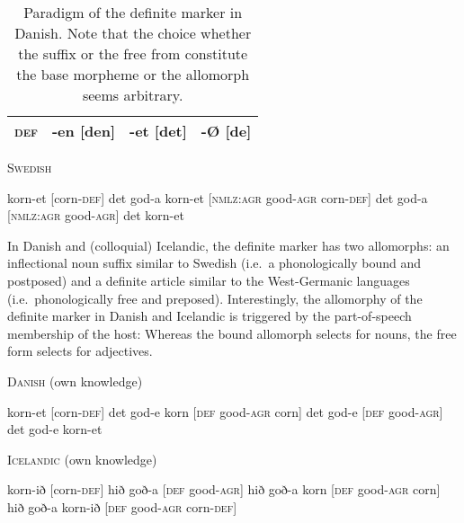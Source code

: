{\begin{table}[h]
\begin{center}
\begin{footnotesize}
\begin{tabular}{l | ccc}
\hline
\textsc{def}&-en [den]			&-et [det]			&-{Ø} [de]\\
\hline
\hline
\end{tabular}
\caption[Paradigm of \textsc{def} in {\sc Danish}]{Paradigm of the definite marker in {\sc Danish}. Note that the choice whether the suffix or the free from constitute the base morpheme or the allomorph seems arbitrary.}\label{danish defallomorph}
\end{footnotesize}
\end{center}
\end{table}
\newpage
\begin{exe}
\ex \textsc{Swedish}
\begin{xlist}
\ex korn-et [corn-\textsc{def}]
\ex det god-a korn-et [\textsc{nmlz:agr} good-\textsc{agr} corn-\textsc{def}]
\ex det god-a [\textsc{nmlz:agr} good-\textsc{agr}]
\ex *det korn-et
\end{xlist}
\end{exe}
In Danish and (colloquial) Icelandic, the definite marker has two allomorphs: an inflectional noun suffix similar to Swedish (i.e.~a phonologically bound and postposed) and a definite article similar to the West-Germanic languages (i.e.~phonologically free and preposed). Interestingly, the allomorphy of the definite marker in Danish and Icelandic is triggered by the part-of-speech membership of the host: Whereas the bound allomorph selects for nouns, the free form selects for adjectives.
\begin{exe}
\ex \textsc{Danish} (own knowledge)
\begin{xlist}
\ex 	korn-et [corn-\textsc{def}]
\ex	det god-e korn [\textsc{def} good-\textsc{agr} corn]
\ex	det god-e [\textsc{def} good-\textsc{agr}]
\ex	*det god-e korn-et
\end{xlist}
\end{exe}
\begin{exe}
\ex \textsc{Icelandic} (own knowledge)
\begin{xlist}
\ex 	korn-ið [corn-\textsc{def}]
\ex	hið goð-a [\textsc{def} good-\textsc{agr}]
\ex	hið goð-a korn [\textsc{def} good-\textsc{agr} corn]
\ex	*hið goð-a korn-ið [\textsc{def} good-\textsc{agr} corn-\textsc{def}]
\end{xlist}
\end{exe}
}
